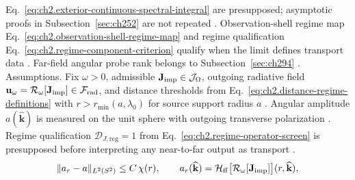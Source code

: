 Eq.~\eqref{eq:ch2.exterior-continuous-spectral-integral} are presupposed; asymptotic proofs in
Subsection~\ref{sec:ch252} are not repeated \cite{stratton1941}. Observation-shell regime map
Eq.~\eqref{eq:ch2.observation-shell-regime-map} and regime qualification
Eq.~\eqref{eq:ch2.regime-component-criterion} qualify when the limit defines transport data
\cite{harrington2001}. Far-field angular probe rank belongs to
Subsection~\ref{sec:ch294} \cite{stratton1941}.
Assumptions. Fix \(\omega>0\), admissible \(\mathbf{J}_{\mathrm{imp}}\in\mathcal{J}_\Omega\), outgoing radiative field
\(\mathbf{u}_\omega=\mathcal{R}_\omega[\mathbf{J}_{\mathrm{imp}}]\in\mathcal{F}_{\mathrm{rad}}\), and distance
thresholds from Eq.~\eqref{eq:ch2.distance-regime-definitions} with \(r>r_{\min}(a,\lambda_0)\)
for source support radius \(a\) \cite{stratton1941}. Angular amplitude
\(a(\widehat{\mathbf{k}})\) is measured on the unit sphere with outgoing transverse polarization
\cite{stratton1941}. Regime qualification \(\mathcal{D}_{J,\mathrm{reg}}=1\) from
Eq.~\eqref{eq:ch2.regime-operator-screen} is presupposed before interpreting any near-to-far
output as transport \cite{harrington2001}. \begin{equation}
\label{eq:ch2.near-to-far-shell-error}
\|a_r-a\|_{L^{2}(S^{2})}
\le
C\,\chi(r),
\qquad
a_r(\widehat{\mathbf{k}})
=
\mathcal{H}_{\mathrm{ff}}\big[\mathcal{R}_\omega[\mathbf{J}_{\mathrm{imp}}]\big](r,\widehat{\mathbf{k}}),
\end{equation}

